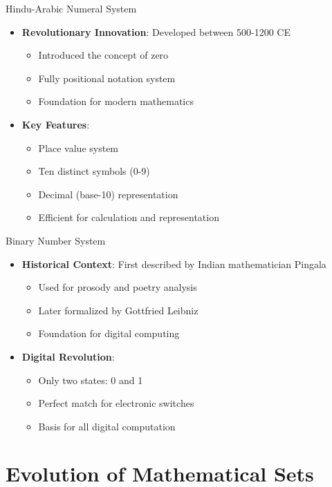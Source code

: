 \documentclass[aspectratio=169,11pt]{beamer}
\newcommand{\concept}[1]{\textbf{\color{accentcolor}#1}}
\begin{document}
\begin{frame}{Hindu-Arabic Numeral System}
\begin{itemize}
\item \concept{Revolutionary Innovation}: Developed between 500-1200 CE
\begin{itemize}
\item Introduced the concept of zero
\item Fully positional notation system
\item Foundation for modern mathematics
\end{itemize}
\vspace{0.5cm}
\item \concept{Key Features}:
\begin{itemize}
\item Place value system
\item Ten distinct symbols (0-9)
\item Decimal (base-10) representation
\item Efficient for calculation and representation
\end{itemize}
\end{itemize}
\end{frame}

\begin{frame}{Binary Number System}
\begin{itemize}
\item \concept{Historical Context}: First described by Indian mathematician Pingala
\begin{itemize}
\item Used for prosody and poetry analysis
\item Later formalized by Gottfried Leibniz
\item Foundation for digital computing
\end{itemize}
\vspace{0.5cm}
\item \concept{Digital Revolution}: 
\begin{itemize}
\item Only two states: 0 and 1
\item Perfect match for electronic switches
\item Basis for all digital computation
\end{itemize}
\end{itemize}
\end{frame}

\section{Evolution of Mathematical Sets}
\end{document}

